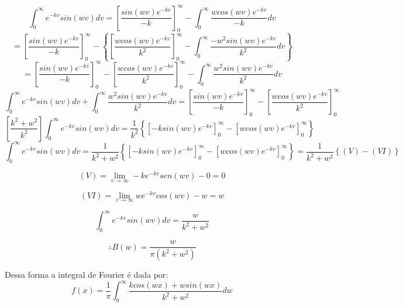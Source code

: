 \begin{equation*}
    \int_0^\infty e^{-kv}sin(wv)dv = \left[\frac{sin(wv)e^{-kv}}{-k}\right]^\infty_0 - \int_0^\infty \frac{wcos(wv)e^{-kv}}{-k}dv
\end{equation*}
\begin{equation*}
    = \left[\frac{sin(wv)e^{-kv}}{-k}\right]^\infty_0 - \left\{\left[\frac{wcos(wv)e^{-kv}}{k^2}\right]^\infty_0 -\int_0^\infty \frac{-w^2sin(wv)e^{-kv}}{k^2}dv\right\}
\end{equation*}
\begin{equation*}
    = \left[\frac{sin(wv)e^{-kv}}{-k}\right]^\infty_0 -\left[\frac{wcos(wv)e^{-kv}}{k^2}\right]^\infty_0 - \int_0^\infty \frac{w^2sin(wv)e^{-kv}}{k^2}dv
\end{equation*}
\begin{equation*}
    \int_0^\infty e^{-kv}sin(wv)dv + \int_0^\infty \frac{w^2sin(wv)e^{-kv}}{k^2}dv = \left[\frac{sin(wv)e^{-kv}}{-k}\right]^\infty_0 -\left[\frac{wcos(wv)e^{-kv}}{k^2}\right]^\infty_0 
\end{equation*}
\begin{equation*}
    \left[\frac{k^2 + w^2}{k^2}\right]\int_0^\infty e^{-kv}sin(wv)dv =  \frac{1}{k^2}\left\{\left[-ksin(wv)e^{-kv}\right]^\infty_0 -\left[wcos(wv)e^{-kv}\right]^\infty_0 \right\}
\end{equation*}
\begin{equation*}
    \int_0^\infty e^{-kv}sin(wv)dv = \frac{1}{k^2 + w^2}   \left\{\left[-ksin(wv)e^{-kv}\right]^\infty_0 -\left[wcos(wv)e^{-kv}\right]^\infty_0 \right\} =  \frac{1}{k^2 + w^2}  \left\{(V) - (VI)\right\} 
\end{equation*}

\begin{equation*}
    (V) = \lim_{v\rightarrow \infty}-ke^{-kv}sen(wv) - 0 =  0
\end{equation*}

\begin{equation*}
    (VI) = \lim_{v\rightarrow \infty}we^{-kv}cos(wv) - w = w 
\end{equation*}

\begin{equation*}
    \int_0^\infty e^{-kv}sin(wv)dv = \frac{w}{k^2 + w^2}
\end{equation*}

\begin{equation*}
    \therefore B(w) = \frac{w}{\pi(k^2 + w^2)}
\end{equation*}

Dessa forma a integral de Fourier é dada por:
\begin{equation*}
    \boxed{f(x) = \frac{1}{\pi}\int_0^\infty \frac{kcos(wx) + wsin(wx)}{k^2+w^2}dw  } 
\end{equation*}
